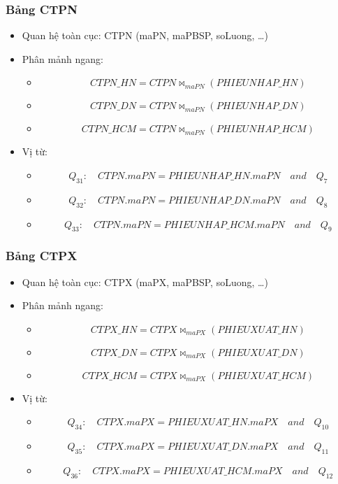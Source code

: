 \documentclass[a4paper,12pt]{report}
\begin{document}
\subsubsection{Bảng CTPN}
\begin{itemize}
    \item Quan hệ toàn cục: CTPN (maPN, maPBSP, soLuong, \ldots)
    \item Phân mảnh ngang:
        \begin{itemize}[label=]
            \item \[CTPN\_HN = CTPN \bowtie_{maPN}(PHIEUNHAP\_HN)\]
            \item \[CTPN\_DN = CTPN \bowtie_{maPN}(PHIEUNHAP\_DN)\]
            \item \[CTPN\_HCM = CTPN \bowtie_{maPN}(PHIEUNHAP\_HCM)\]
        \end{itemize}
    \item Vị từ:
    \begin{itemize}[label=]
        \item \[Q_{31}\colon\quad CTPN.maPN = PHIEUNHAP\_HN.maPN \quad and \quad Q_7\]
        \item \[Q_{32}\colon\quad CTPN.maPN = PHIEUNHAP\_DN.maPN \quad and \quad Q_8 \]
        \item \[Q_{33}\colon\quad CTPN.maPN = PHIEUNHAP\_HCM.maPN \quad and \quad Q_9\]
    \end{itemize}
\end{itemize}
\subsubsection{Bảng CTPX}
\begin{itemize}
    \item Quan hệ toàn cục: CTPX (maPX, maPBSP, soLuong,  \ldots)
    \item Phân mảnh ngang:
        \begin{itemize}[label=]
            \item \[CTPX\_HN = CTPX \bowtie_{maPX}(PHIEUXUAT\_HN)\]
            \item \[CTPX\_DN = CTPX \bowtie_{maPX}(PHIEUXUAT\_DN)\]
            \item \[CTPX\_HCM = CTPX \bowtie_{maPX}(PHIEUXUAT\_HCM)\]
        \end{itemize}
    \item Vị từ:
    \begin{itemize}[label=]
        \item \[Q_{34}\colon\quad CTPX.maPX = PHIEUXUAT\_HN.maPX \quad and \quad Q_{10}\]
        \item \[Q_{35}\colon\quad CTPX.maPX = PHIEUXUAT\_DN.maPX \quad and \quad Q_{11} \]
        \item \[Q_{36}\colon\quad CTPX.maPX = PHIEUXUAT\_HCM.maPX \quad and \quad Q_{12}\]
    \end{itemize}
\end{itemize}
\end{document}

